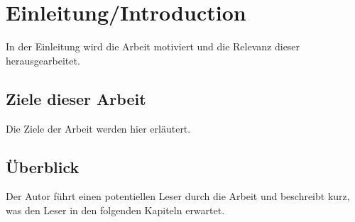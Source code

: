 \chapter{Einleitung/Introduction}
In der Einleitung wird die Arbeit motiviert und die Relevanz dieser herausgearbeitet.

\section{Ziele dieser Arbeit}
Die Ziele der Arbeit werden hier erläutert. 

\section{Überblick}
Der Autor führt einen potentiellen Leser durch die Arbeit und beschreibt kurz, was den Leser in den folgenden Kapiteln erwartet.

